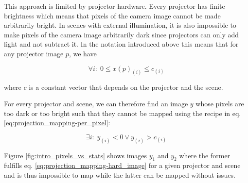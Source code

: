 This approach is limited by projector hardware. Every projector has finite brightness which means that pixels of the camera image cannot be made arbitrarily bright. In scenes with external illumination, it is also impossible to make pixels of the camera image arbitrarily dark since projectors can only add light and not subtract it. In the notation introduced above this means that for any projector image \(p\), we have

\begin{equation}
    \label{eq:projection_mapping-limitations}
    \forall i:\; 0 \leq x(p)_{(i)} \leq c_{(i)}
\end{equation}

where \(c\) is a constant vector that depends on the projector and the scene.

For every projector and scene, we can therefore find an image \(y\) whose pixels are too dark or too bright such that they cannot be mapped using the recipe in eq. \ref{eq:projection_mapping-per_pixel}:

\begin{equation}
    \label{eq:projection_mapping-hard_image}
    \exists i:\; y_{(i)} < 0 \lor y_{(i)} > c_{(i)}
\end{equation}

Figure \ref{fig:intro_pixels_vs_stats} shows images \(y_1\) and \(y_2\) where the former fulfills eq. \ref{eq:projection_mapping-hard_image} for a given projector and scene and is thus impossible to map while the latter can be mapped without issues.

